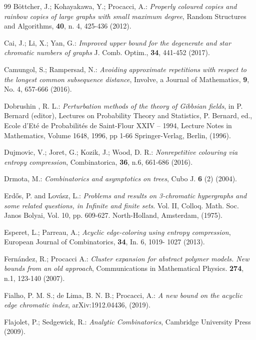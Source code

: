 \documentclass[11pt]{article}
\begin{document}
\begin{thebibliography}{99}
  B\"{o}ttcher, J.; Kohayakawa, Y.; Procacci, A.: {\it Properly coloured copies and rainbow copies of large graphs with small maximum degree},
Random Structures and Algorithms, {\bf 40}, n. 4,  425-436 (2012).

 Cai, J.; Li, X.; Yan, G.: {\it Improved upper bound for the degenerate and star
chromatic numbers of graphs} J. Comb. Optim.,  {\bf 34}, 441-452 (2017).

 Camungol, S.; Rampersad, N.:  {\it Avoiding approximate repetitions with respect to the
longest common subsequence distance}, Involve, a Journal of Mathematics, {\bf 9},  No. 4, 657-666 (2016).

 Dobrushin , R. L.: {\it Perturbation methods of the theory of
Gibbsian fields}, in P. Bernard (editor), Lectures on Probability Theory and Statistics,
P. Bernard, ed., Ecole d'Et\'e de Probabilit\'es de
Saint-Flour XXIV – 1994,
Lecture Notes in Mathematics, Volume 1648, 1996, pp 1-66
Springer-Verlag, Berlin, (1996).


 Dujmovic, V.; Joret, G.; Kozik, J.; Wood, D. R.:
{\it Nonrepetitive colouring via entropy compression}, Combinatorica, {\bf 36}, n.6,  661-686 (2016).

 Drmota, M.: {\it Combinatorics and asymptotics on trees}, Cubo J. {\bf 6} (2) (2004).


Erd\H{o}s, P. and Lov\'{a}sz, L.: {\it Problems and results on 3-chromatic
hypergraphs and some related questions, in Infinite and finite
sets}. Vol. II, Colloq. Math. Soc. Janos Bolyai, Vol. 10, pp. 609-627.
North-Holland, Amsterdam, (1975).

 Esperet, L.; Parreau, A.; {\it Acyclic edge-coloring using entropy
compression}, European Journal of Combinatorics, {\bf 34}, In. 6,
1019- 1027 (2013).

 Fern\'andez, R.; Procacci A.: {\it Cluster
expansion for abstract polymer models. New bounds from an old
approach}, Communications in Mathematical Physics. {\bf 274}, n.1,
123-140 (2007).
%

 Fialho, P. M. S.; de Lima, B. N. B.; Procacci, A.: {\it A new bound on the acyclic edge chromatic index},  arXiv:1912.04436, (2019).

 Flajolet, P.; Sedgewick, R.: {\it Analytic Combinatorics}, Cambridge University Press (2009).


\end{thebibliography}
\end{document}
